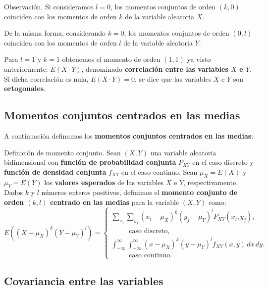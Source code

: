 \documentclass[]{book}
\begin{document}
Observación.
Si consideramos \(l=0\), los momentos conjuntos de orden \((k,0)\) coinciden con los momentos de orden \(k\) de la variable aleatoria \(X\).

De la misma forma, considerando \(k=0\), los momentos conjuntos de orden \((0,l)\) coinciden con los momentos de orden \(l\) de la variable aleatoria \(Y\).

Para \(l=1\) y \(k=1\) obtenemos el momento de orden \((1,1)\) ya visto anteriormente: \(E(X\cdot Y)\), denominado \textbf{correlación entre las variables \(X\) e \(Y\)}. Si dicha correlación es nula, \(E(X\cdot Y)=0\), se dice que las variables \(X\) e \(Y\) son \textbf{ortogonales}.

\hypertarget{momentos-conjuntos-centrados-en-las-medias}{%
\subsection{Momentos conjuntos centrados en las medias}\label{momentos-conjuntos-centrados-en-las-medias}}

A continuación definamos los \textbf{momentos conjuntos centrados en las medias}:

Definición de momento conjunto.
Sean \((X,Y)\) una variable aleatoria bidimensional con \textbf{función de probabilidad conjunta} \(P_{XY}\) en el caso discreto y \textbf{función de densidad conjunta} \(f_{XY}\) en el caso continuo. Sean \(\mu_X=E(X)\) y \(\mu_Y=E(Y)\) los \textbf{valores esperados} de las variables \(X\) e \(Y\), respectivamente. Dados \(k\) y \(l\) números enteros positivos, definimos el \textbf{momento conjunto de orden \((k,l)\) centrado en las medias} para la variable \((X,Y)\) como:
\[
E\left((X-\mu_X)^k (Y-\mu_Y)^l\right)=\begin{cases}
\sum_{x_i}\sum_{y_j} (x_i-\mu_X)^k (y_j-\mu_Y)^l P_{XY}(x_i,y_j), & \\\ \qquad \mbox{ caso discreto,}& \\
\int_{-\infty}^\infty\int_{-\infty}^\infty (x-\mu_X)^k (y-\mu_Y)^l f_{XY}(x,y)\, dx\, dy. & \\ \ \qquad\mbox{ caso continuo.} &
\end{cases}
\]

\hypertarget{covariancia-entre-las-variables}{%
\subsection{Covariancia entre las variables}\label{covariancia-entre-las-variables}}
\end{document}

